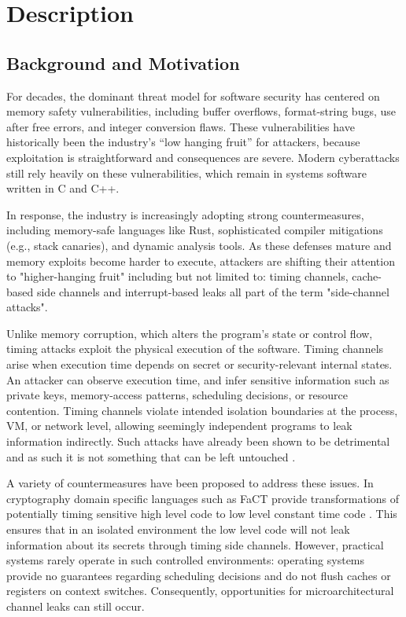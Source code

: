 \section{Description}
\subsection{Background and Motivation}
For decades, the dominant threat model for software security has centered on
memory safety vulnerabilities, including buffer overflows, format-string bugs,
use after free errors, and integer conversion flaws. These vulnerabilities have
historically been the industry’s “low hanging fruit” for attackers, because
exploitation is straightforward and consequences are severe. Modern
cyberattacks still rely heavily on these vulnerabilities, which remain in
systems software written in C and C++.

In response, the industry is increasingly adopting strong countermeasures,
including memory-safe languages like Rust, sophisticated compiler mitigations
(e.g., stack canaries), and dynamic analysis tools. As these defenses mature
and memory exploits become harder to execute, attackers are shifting their
attention to "higher-hanging fruit" including but not limited to: timing
channels, cache-based side channels and interrupt-based leaks all part of the
term "side-channel attacks".

Unlike memory corruption, which alters the program's state or control flow,
timing attacks exploit the physical execution of the software. Timing channels
arise when execution time depends on secret or security-relevant internal
states. An attacker can observe execution time, and infer sensitive information
such as private keys, memory-access patterns, scheduling decisions, or resource
contention. Timing channels violate intended isolation boundaries at the
process, VM, or network level, allowing seemingly independent programs to leak
information indirectly. Such attacks have already been shown to be detrimental
and as such it is not something that can be left untouched \cite{spectre,
meltdown}.

A variety of countermeasures have been proposed to address these issues. In
cryptography domain specific languages such as FaCT provide transformations of
potentially timing sensitive high level code to low level constant time code
\cite{cauligiFaCTDSLTimingsensitive2019}. This ensures that in an isolated
environment the low level code will not leak information about its secrets
through timing side channels. However, practical systems rarely operate in such
controlled environments: operating systems provide no guarantees regarding
scheduling decisions and do not flush caches or registers on context switches.
Consequently, opportunities for microarchitectural channel leaks can still
occur. 

